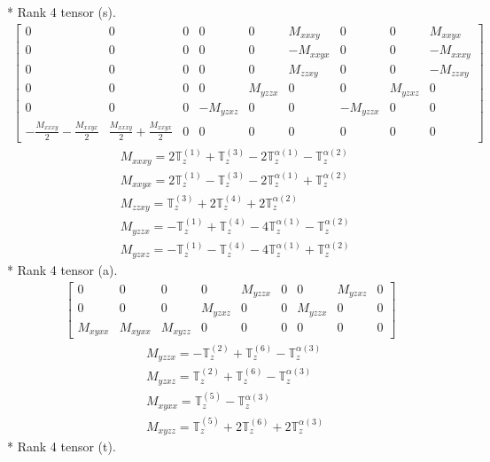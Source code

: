 \documentclass[fleqn,8pt,landscape]{jsarticle}
\begin{document}
* Rank 4 tensor (s).
\begin{align*}
\begin{bmatrix} 0 & 0 & 0 & 0 & 0 & M_{xxxy} & 0 & 0 & M_{xxyx} \\ 0 & 0 & 0 & 0 & 0 & - M_{xxyx} & 0 & 0 & - M_{xxxy} \\ 0 & 0 & 0 & 0 & 0 & M_{zzxy} & 0 & 0 & - M_{zzxy} \\ 0 & 0 & 0 & 0 & M_{yzzx} & 0 & 0 & M_{yzxz} & 0 \\ 0 & 0 & 0 & - M_{yzxz} & 0 & 0 & - M_{yzzx} & 0 & 0 \\ - \frac{M_{xxxy}}{2} - \frac{M_{xxyx}}{2} & \frac{M_{xxxy}}{2} + \frac{M_{xxyx}}{2} & 0 & 0 & 0 & 0 & 0 & 0 & 0 \end{bmatrix}
\end{align*}
\begin{align*}
& M_{xxxy} = 2 \mathbb{T}_{z}^{(1)} + \mathbb{T}_{z}^{(3)} - 2 \mathbb{T}_{z}^{\alpha(1)} - \mathbb{T}_{z}^{\alpha(2)} \\
& M_{xxyx} = 2 \mathbb{T}_{z}^{(1)} - \mathbb{T}_{z}^{(3)} - 2 \mathbb{T}_{z}^{\alpha(1)} + \mathbb{T}_{z}^{\alpha(2)} \\
& M_{zzxy} = \mathbb{T}_{z}^{(3)} + 2 \mathbb{T}_{z}^{(4)} + 2 \mathbb{T}_{z}^{\alpha(2)} \\
& M_{yzzx} = - \mathbb{T}_{z}^{(1)} + \mathbb{T}_{z}^{(4)} - 4 \mathbb{T}_{z}^{\alpha(1)} - \mathbb{T}_{z}^{\alpha(2)} \\
& M_{yzxz} = - \mathbb{T}_{z}^{(1)} - \mathbb{T}_{z}^{(4)} - 4 \mathbb{T}_{z}^{\alpha(1)} + \mathbb{T}_{z}^{\alpha(2)}
\end{align*}
* Rank 4 tensor (a).
\begin{align*}
\begin{bmatrix} 0 & 0 & 0 & 0 & M_{yzzx} & 0 & 0 & M_{yzxz} & 0 \\ 0 & 0 & 0 & M_{yzxz} & 0 & 0 & M_{yzzx} & 0 & 0 \\ M_{xyxx} & M_{xyxx} & M_{xyzz} & 0 & 0 & 0 & 0 & 0 & 0 \end{bmatrix}
\end{align*}
\begin{align*}
& M_{yzzx} = - \mathbb{T}_{z}^{(2)} + \mathbb{T}_{z}^{(6)} - \mathbb{T}_{z}^{\alpha(3)} \\
& M_{yzxz} = \mathbb{T}_{z}^{(2)} + \mathbb{T}_{z}^{(6)} - \mathbb{T}_{z}^{\alpha(3)} \\
& M_{xyxx} = \mathbb{T}_{z}^{(5)} - \mathbb{T}_{z}^{\alpha(3)} \\
& M_{xyzz} = \mathbb{T}_{z}^{(5)} + 2 \mathbb{T}_{z}^{(6)} + 2 \mathbb{T}_{z}^{\alpha(3)}
\end{align*}
* Rank 4 tensor (t).
\end{document}
